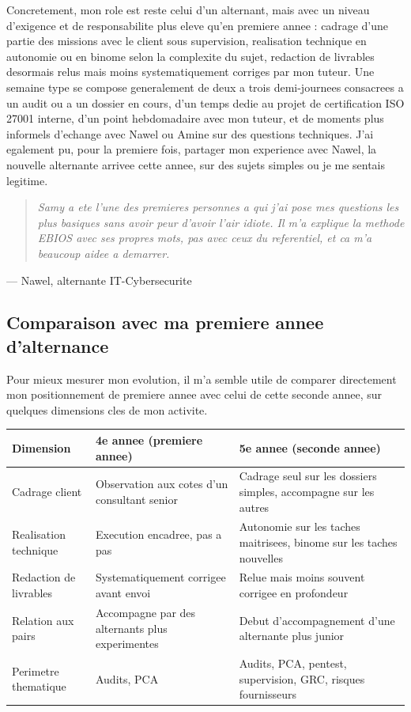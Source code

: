 \documentclass[11pt,a4paper]{article}
\newcommand{\citationperso}[2]{%
\par\smallskip\noindent\begin{quote}\itshape #1\end{quote}
\hfill --- #2\par\smallskip
}
\begin{document}
Concretement, mon role est reste celui d'un alternant, mais avec un niveau d'exigence et de responsabilite plus eleve qu'en premiere annee : cadrage d'une partie des missions avec le client sous supervision, realisation technique en autonomie ou en binome selon la complexite du sujet, redaction de livrables desormais relus mais moins systematiquement corriges par mon tuteur. Une semaine type se compose generalement de deux a trois demi-journees consacrees a un audit ou a un dossier en cours, d'un temps dedie au projet de certification ISO 27001 interne, d'un point hebdomadaire avec mon tuteur, et de moments plus informels d'echange avec Nawel ou Amine sur des questions techniques. J'ai egalement pu, pour la premiere fois, partager mon experience avec Nawel, la nouvelle alternante arrivee cette annee, sur des sujets simples ou je me sentais legitime.

\citationperso{Samy a ete l'une des premieres personnes a qui j'ai pose mes questions les plus basiques sans avoir peur d'avoir l'air idiote. Il m'a explique la methode EBIOS avec ses propres mots, pas avec ceux du referentiel, et ca m'a beaucoup aidee a demarrer.}{Nawel, alternante IT-Cybersecurite}

\subsection{Comparaison avec ma premiere annee d'alternance}

Pour mieux mesurer mon evolution, il m'a semble utile de comparer directement mon positionnement de premiere annee avec celui de cette seconde annee, sur quelques dimensions cles de mon activite.

\begin{center}
\small
\begin{tabular}{@{}p{4.2cm}p{4.9cm}p{4.9cm}@{}}
\toprule
\textbf{Dimension} & \textbf{4e annee (premiere annee)} & \textbf{5e annee (seconde annee)} \\
\midrule
Cadrage client & Observation aux cotes d'un consultant senior & Cadrage seul sur les dossiers simples, accompagne sur les autres \\
Realisation technique & Execution encadree, pas a pas & Autonomie sur les taches maitrisees, binome sur les taches nouvelles \\
Redaction de livrables & Systematiquement corrigee avant envoi & Relue mais moins souvent corrigee en profondeur \\
Relation aux pairs & Accompagne par des alternants plus experimentes & Debut d'accompagnement d'une alternante plus junior \\
Perimetre thematique & Audits, PCA & Audits, PCA, pentest, supervision, GRC, risques fournisseurs \\
\bottomrule
\end{tabular}
\end{center}
\end{document}

